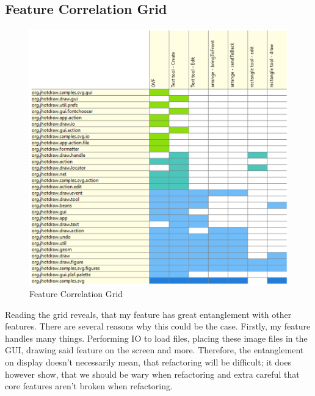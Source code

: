 \subsection{Feature Correlation Grid}
\begin{figure}[H]
    \includegraphics[width=\textwidth]{Images/featureousgrid.png}
    \caption{Feature Correlation Grid}
\end{figure}
Reading the grid reveals, that my feature has great entanglement with other features. There are several reasons why this could be the case. Firstly, my feature handles many things. Performing IO to load files, placing these image files in the GUI, drawing said feature on the screen and more. Therefore, the entanglement on display doesn't necessarily mean, that refactoring will be difficult; it does however show, that we should be wary when refactoring and extra careful that core features aren't broken when refactoring.

